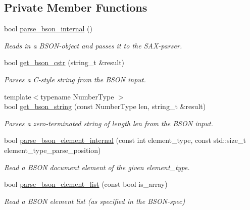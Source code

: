 \subsection*{Private Member Functions}
\begin{DoxyCompactItemize}
\item 
bool \mbox{\hyperlink{classnlohmann_1_1detail_1_1binary__reader_a950f6ef800421fef9499af1c4c8918f5}{parse\+\_\+bson\+\_\+internal}} ()
\begin{DoxyCompactList}\small\item\em Reads in a B\+S\+O\+N-\/object and passes it to the S\+A\+X-\/parser. \end{DoxyCompactList}\item 
bool \mbox{\hyperlink{classnlohmann_1_1detail_1_1binary__reader_a075d20a35a09496c504c7dff135823ed}{get\+\_\+bson\+\_\+cstr}} (string\+\_\+t \&result)
\begin{DoxyCompactList}\small\item\em Parses a C-\/style string from the B\+S\+ON input. \end{DoxyCompactList}\item 
{\footnotesize template$<$typename Number\+Type $>$ }\\bool \mbox{\hyperlink{classnlohmann_1_1detail_1_1binary__reader_a46bf64d7193eea97cac6dd4d4abdb4fa}{get\+\_\+bson\+\_\+string}} (const Number\+Type len, string\+\_\+t \&result)
\begin{DoxyCompactList}\small\item\em Parses a zero-\/terminated string of length {\itshape len} from the B\+S\+ON input. \end{DoxyCompactList}\item 
bool \mbox{\hyperlink{classnlohmann_1_1detail_1_1binary__reader_a2fdd24de008063e7fef896327daeffa1}{parse\+\_\+bson\+\_\+element\+\_\+internal}} (const int element\+\_\+type, const std\+::size\+\_\+t element\+\_\+type\+\_\+parse\+\_\+position)
\begin{DoxyCompactList}\small\item\em Read a B\+S\+ON document element of the given {\itshape element\+\_\+type}. \end{DoxyCompactList}\item 
bool \mbox{\hyperlink{classnlohmann_1_1detail_1_1binary__reader_a7316619ace9efdc718d04e7b8f807e1e}{parse\+\_\+bson\+\_\+element\+\_\+list}} (const bool is\+\_\+array)
\begin{DoxyCompactList}\small\item\em Read a B\+S\+ON element list (as specified in the B\+S\+O\+N-\/spec) \end{DoxyCompactList}\item 

\end{DoxyCompactItemize}
